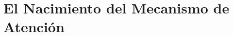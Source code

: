 \documentclass[aspectratio=169]{beamer}
\begin{document}

\section{El Nacimiento del Mecanismo de Atención}
\end{document}
